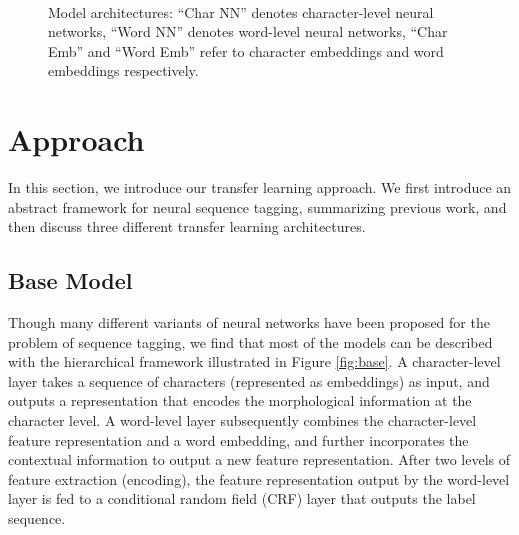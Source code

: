 \documentclass{article} \usepackage{iclr2017_conference,times}
\begin{document}
 
\begin{figure*}[t]
\centering
     ~~~~~~~~
\vspace{0.1in}
     ~~~~~~~~~~~
    \caption{Model architectures: ``Char NN'' denotes character-level neural networks, ``Word NN'' denotes word-level neural networks, ``Char Emb'' and ``Word Emb'' refer to character embeddings and word embeddings respectively.}\label{fig:transfer}
 \vspace{-0.1in}
\end{figure*}

\section{Approach}

In this section, we introduce our transfer learning approach. We first introduce an abstract framework for neural sequence tagging, summarizing previous work, and then discuss three different transfer learning architectures.

\subsection{Base Model}

Though many different variants of neural networks have been proposed for the problem of sequence tagging, we find that most of the models can be described with the hierarchical framework illustrated in Figure \ref{fig:base}. A character-level layer takes a sequence of characters (represented as embeddings) as input, and outputs a representation that encodes the morphological information at the character level. A word-level layer subsequently combines the character-level feature representation and a word embedding, and further incorporates the contextual information to output a new feature representation. After two levels of feature extraction (encoding), the feature representation output by the word-level layer is fed to a conditional random field (CRF) layer that outputs the label sequence.
\end{document}
